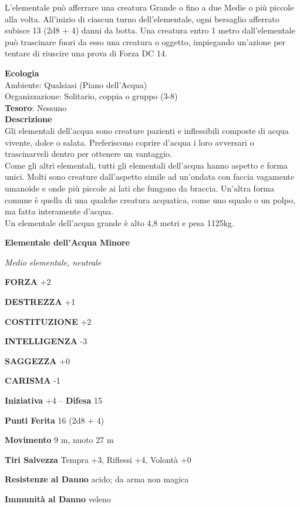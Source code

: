 \begin{multicols}{2}
	L'elementale può afferrare una creatura Grande o fino a due Medie o più piccole alla volta. All'inizio di ciascun turno dell'elementale, ogni bersaglio afferrato subisce 13 (2d8 + 4) danni da botta. Una creatura entro 1 metro dall'elementale può trascinare fuori da esso una creatura o oggetto, impiegando un'azione per tentare di riuscire una prova di Forza DC 14.

	\textbf{Ecologia}\\
	Ambiente: Qualsiasi (Piano dell'Acqua)\\
	Organizzazione: Solitario, coppia o gruppo (3-8)\\
	\textbf{Tesoro}: Nessuno\\
	\textbf{Descrizione}\\
	Gli elementali dell'acqua sono creature pazienti e inflessibili composte di acqua vivente, dolce o salata. Preferiscono coprire d'acqua i loro avversari o trascinarveli dentro per ottenere un vantaggio.\\
	Come gli altri elementali, tutti gli elementali dell'acqua hanno aspetto e forma unici. Molti sono creature dall'aspetto simile ad un'ondata con faccia vagamente umanoide e onde più piccole ai lati che fungono da braccia. Un'altra forma comune è quella di una qualche creatura acquatica, come uno squalo o un polpo, ma fatta interamente d'acqua.\\
	Un elementale dell'acqua grande è alto 4,8 metri e pesa 1125kg.


	\medskip{}\textbf{Elementale dell'Acqua Minore}

	\textit{Medio elementale, neutrale}

	\textbf{FORZA} +2

	\textbf{DESTREZZA} +1

	\textbf{COSTITUZIONE} +2

	\textbf{INTELLIGENZA} -3

	\textbf{SAGGEZZA} +0

	\textbf{CARISMA} -1

	\textbf{Iniziativa} +4 -- \textbf{Difesa} 15

	\textbf{Punti Ferita} 16 (2d8 + 4)

	\textbf{Movimento} 9 m, nuoto 27 m

	\textbf{Tiri Salvezza} Tempra +3, Riflessi +4, Volontà +0

	\textbf{Resistenze al Danno} acido; da arma non magica

	\textbf{Immunità al Danno} veleno


\end{multicols}
